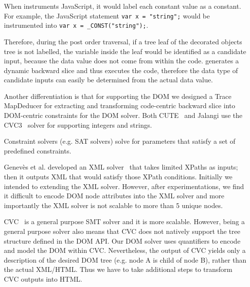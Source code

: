 When \tool instruments JavaScript, it would label each constant value as a constant.
For example, the JavaScript statement {\tt var x = "string";} would be instrumented into {\tt var x = \_CONST("string");}.  
  
Therefore, during the post order traversal, if a tree leaf of the decorated objects tree is not labelled, the variable inside the leaf would be identified as a candidate input, 
because the data value does not come from within the code.  
\tool generates a dynamic backward slice and thus executes the code, therefore the data type of candidate inputs can easily be determined from the actual data value.  

Another differentiation is that for supporting the DOM we designed a Trace MapDeducer for extracting and transforming code-centric backward slice into DOM-centric constraints for the DOM solver.  
Both CUTE~\cite{cute} and Jalangi use the CVC3~\cite{cvc3} solver for supporting integers and strings.  





Constraint solvers (e.g. SAT solvers) solve for parameters that satisfy a set of predefined constraints.  

Genev\`{e}s et al. developed an XML solver~\cite{xmlsolver} that takes limited XPaths as inputs; then it outputs XML that would satisfy those XPath conditions. 
Initially we intended to extending the XML solver.  However, after experimentations, we find it difficult to encode DOM node attributes into the XML solver and 
more importantly the XML solver is not scalable to more than 5 unique nodes. 

CVC~\cite{cvc3, cvc4} is a general purpose SMT solver and it is more scalable.  
However, being a general purpose solver also means that CVC does not natively support the tree structure defined in the DOM API.  
Our DOM solver uses quantifiers to encode and model the DOM within CVC.  
Nevertheless, the output of CVC yields only a description of the desired DOM tree (e.g. node A is child of node B), rather than the actual XML/HTML. 
Thus we have to take additional steps to transform CVC outputs into HTML.


